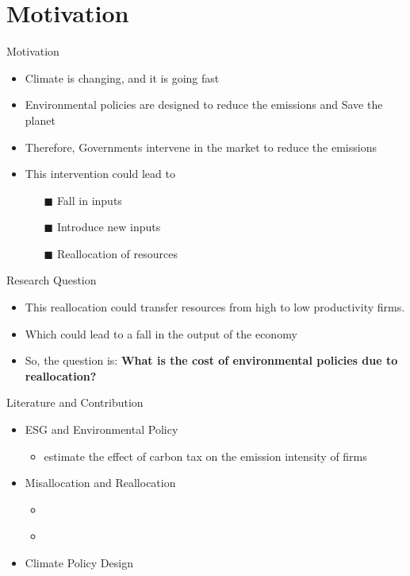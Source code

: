 \documentclass[aspectratio=169]{beamer}
\subtitle{}
\institute[SSE]{Stockholm School of Economics}
\begin{document}
\maketitle
\section{Motivation}
\begin{frame}{Motivation}\large 
	\begin{itemize}
		\item Climate is changing, and it is going fast
		\item Environmental policies are designed to reduce the emissions and Save the planet
		\pause
		\item Therefore, Governments intervene in the market to reduce the emissions
		\item This intervention could lead to 
			\pause
			\begin{itemize}
				\item[$\blacksquare$] Fall in inputs 
				\item[$\blacksquare$] Introduce new inputs
				\item[$\blacksquare$] Reallocation of resources 
			\end{itemize}
	\end{itemize}
\end{frame}


\begin{frame}{Research Question}
	\begin{itemize}
		\item This reallocation could transfer resources from high to low productivity firms.
		\item Which could lead to a fall in the output of the economy
		\item So, the question is: \textbf{What is the cost of environmental policies due to reallocation?}
	\end{itemize}
\end{frame}

\begin{frame}{Literature and Contribution}
	\begin{itemize}
		\item ESG and Environmental Policy 
		\begin{itemize}
			\item \cite{martinsson2024effect} estimate the effect of carbon tax on the emission intensity of firms
		\end{itemize}
		\item Misallocation and Reallocation
		\begin{itemize}
			\item \cite{hsieh2009misallocation}
			\item \cite{whited2021misallocation}
		\end{itemize}
		\item Climate Policy Design
	\end{itemize}
	
\end{frame}
\end{document}
